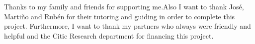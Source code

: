 \documentclass[11pt,a4paper,titlepage,oneside]{report}
\begin{document}

 
 \paxinaenbranco
 \begin{agradecementos}
Thanks to my family and friends for supporting me.Also I want to thank José, Martiño and Rubén for their tutoring and guiding in order to complete this project. Furthermore, I want to thank my partners who always were friendly and helpful and the Citic Research department for financing this project.                %
 \end{agradecementos}
 

 \setcounter{page}{1}

 \tableofcontents
 \listoffigures
 \listoftables
 \clearpage
 
 \setcounter{page}{1}


 
 
 
 
 
 

%
 


 \appendix
 \appendixpage
 
%

 \printglossary[type=\acronymtype,title=\nomeglosarioacronimos]
 \printglossary[title=\nomeglosariotermos]

 
 
 \clearpage
 
\end{document}

